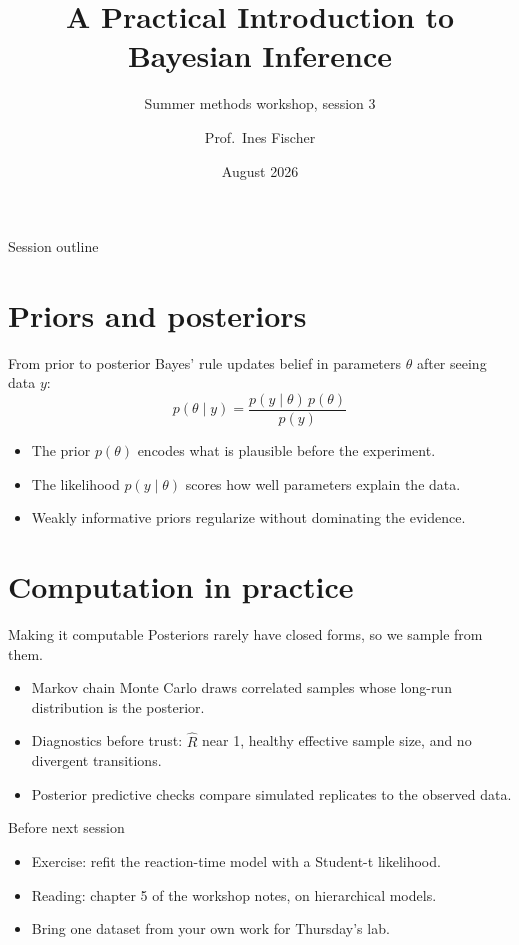 \documentclass[aspectratio=169]{beamer}
\title[Bayesian Inference]{A Practical Introduction to Bayesian Inference}
\subtitle{Summer methods workshop, session 3}
\author[I. Fischer]{Prof.\ Ines Fischer}
\institute[Lakeview Institute]{Lakeview Institute for Quantitative Methods}
\date{August 2026}
\begin{document}
\begin{frame}
  \titlepage
\end{frame}

\begin{frame}{Session outline}
  \tableofcontents
\end{frame}

\section{Priors and posteriors}

\begin{frame}{From prior to posterior}
  Bayes' rule updates belief in parameters $\theta$ after seeing data $y$:
  \[
    p(\theta \mid y) = \frac{p(y \mid \theta)\, p(\theta)}{p(y)}
  \]
  \begin{itemize}
    \item The prior $p(\theta)$ encodes what is plausible before the experiment.
    \item The likelihood $p(y \mid \theta)$ scores how well parameters explain the data.
    \item Weakly informative priors regularize without dominating the evidence.
  \end{itemize}
\end{frame}

\section{Computation in practice}

\begin{frame}{Making it computable}
  Posteriors rarely have closed forms, so we sample from them.
  \begin{itemize}
    \item Markov chain Monte Carlo draws correlated samples whose long-run
          distribution is the posterior.
    \item Diagnostics before trust: $\widehat{R}$ near 1, healthy effective
          sample size, and no divergent transitions.
    \item Posterior predictive checks compare simulated replicates to the
          observed data.
  \end{itemize}
\end{frame}

\begin{frame}{Before next session}
  \begin{itemize}
    \item Exercise: refit the reaction-time model with a Student-t likelihood.
    \item Reading: chapter 5 of the workshop notes, on hierarchical models.
    \item Bring one dataset from your own work for Thursday's lab.
  \end{itemize}
\end{frame}
\end{document}
